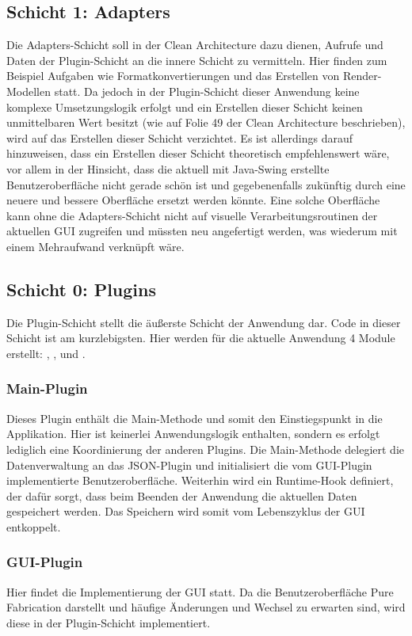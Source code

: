 \subsection{Schicht 1: Adapters}
Die Adapters-Schicht soll in der Clean Architecture dazu dienen, Aufrufe und Daten der Plugin-Schicht an die innere Schicht zu vermitteln.
Hier finden zum Beispiel Aufgaben wie Formatkonvertierungen und das Erstellen von Render-Modellen statt.
Da jedoch in der Plugin-Schicht dieser Anwendung keine komplexe Umsetzungslogik erfolgt und ein Erstellen dieser Schicht keinen unmittelbaren Wert besitzt (wie auf Folie 49 der Clean Architecture beschrieben), wird auf das Erstellen dieser Schicht verzichtet.
Es ist allerdings darauf hinzuweisen, dass ein Erstellen dieser Schicht theoretisch empfehlenswert wäre, vor allem in der Hinsicht, dass die aktuell mit Java-Swing erstellte Benutzeroberfläche nicht gerade schön ist und gegebenenfalls zukünftig durch eine neuere und bessere Oberfläche ersetzt werden könnte.
Eine solche Oberfläche kann ohne die Adapters-Schicht nicht auf visuelle Verarbeitungsroutinen der aktuellen GUI zugreifen und müssten neu angefertigt werden, was wiederum mit einem Mehraufwand verknüpft wäre.

\subsection{Schicht 0: Plugins}
Die Plugin-Schicht stellt die äußerste Schicht der Anwendung dar.
Code in dieser Schicht ist am kurzlebigsten.
Hier werden für die aktuelle Anwendung 4 Module erstellt: , ,  und .

\subsubsection{Main-Plugin}
Dieses Plugin enthält die Main-Methode und somit den Einstiegspunkt in die Applikation.
Hier ist keinerlei Anwendungslogik enthalten, sondern es erfolgt lediglich eine Koordinierung der anderen Plugins.
Die Main-Methode delegiert die Datenverwaltung an das JSON-Plugin und initialisiert die vom GUI-Plugin implementierte Benutzeroberfläche.
Weiterhin wird ein Runtime-Hook definiert, der dafür sorgt, dass beim Beenden der Anwendung die aktuellen Daten gespeichert werden.
Das Speichern wird somit vom Lebenszyklus der GUI entkoppelt.

\subsubsection{GUI-Plugin}
Hier findet die Implementierung der GUI statt.
Da die Benutzeroberfläche Pure Fabrication darstellt und häufige Änderungen und Wechsel zu erwarten sind, wird diese in der Plugin-Schicht implementiert.

